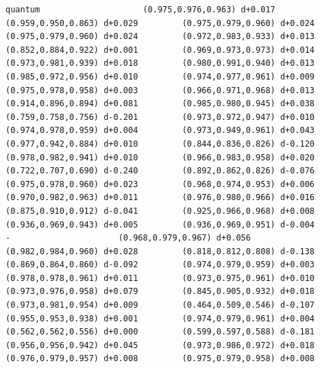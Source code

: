 \documentclass[11pt, letterpaper, openany]{book}
\begin{document}
\begin{empiricalbox}
\begin{lstlisting}[style=terminal]
quantum                     (0.975,0.976,0.963) d+0.017         (0.959,0.950,0.863) d+0.029         (0.975,0.979,0.960) d+0.024         (0.975,0.979,0.960) d+0.024         (0.972,0.983,0.933) d+0.013         (0.852,0.884,0.922) d+0.001         (0.969,0.973,0.973) d+0.014         (0.973,0.981,0.939) d+0.018         (0.980,0.991,0.940) d+0.013         (0.985,0.972,0.956) d+0.010         (0.974,0.977,0.961) d+0.009         (0.975,0.978,0.958) d+0.003         (0.966,0.971,0.968) d+0.013         (0.914,0.896,0.894) d+0.081         (0.985,0.980,0.945) d+0.038         (0.759,0.758,0.756) d-0.201         (0.973,0.972,0.947) d+0.010         (0.974,0.978,0.959) d+0.004         (0.973,0.949,0.961) d+0.043         (0.977,0.942,0.884) d+0.010         (0.844,0.836,0.826) d-0.120         (0.978,0.982,0.941) d+0.010         (0.966,0.983,0.958) d+0.020         (0.722,0.707,0.690) d-0.240         (0.892,0.862,0.826) d-0.076         (0.975,0.978,0.960) d+0.023         (0.968,0.974,0.953) d+0.006         (0.970,0.982,0.963) d+0.011         (0.976,0.980,0.966) d+0.016         (0.875,0.910,0.912) d-0.041         (0.925,0.966,0.968) d+0.008         (0.936,0.969,0.943) d+0.005         (0.936,0.969,0.951) d-0.004                      -                      (0.968,0.979,0.967) d+0.056         (0.982,0.984,0.960) d+0.028         (0.818,0.812,0.808) d-0.138         (0.869,0.864,0.860) d-0.092         (0.974,0.979,0.959) d+0.003         (0.978,0.978,0.961) d+0.011         (0.973,0.975,0.961) d+0.010         (0.973,0.976,0.958) d+0.079         (0.845,0.905,0.932) d+0.018         (0.973,0.981,0.954) d+0.009         (0.464,0.509,0.546) d-0.107         (0.955,0.953,0.938) d+0.001         (0.974,0.979,0.961) d+0.004         (0.562,0.562,0.556) d+0.000         (0.599,0.597,0.588) d-0.181         (0.956,0.956,0.942) d+0.045         (0.973,0.986,0.972) d+0.018         (0.976,0.979,0.957) d+0.008         (0.975,0.979,0.958) d+0.008     

\end{lstlisting}
\end{empiricalbox}
\end{document}
